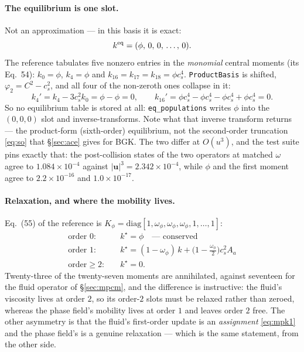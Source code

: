 \documentclass[11pt,a4paper]{article}
\newcommand{\code}[1]{\texttt{\small #1}}
\newcommand{\cs}{c_s}
\newcommand{\uu}{\bm{u}}
\newcommand{\e}[1]{\times 10^{#1}}
\begin{document}
\paragraph{The equilibrium is one slot.} Not an approximation --- in this basis it
is exact:
\begin{equation}
  k^{\rm eq} = (\phi,\,0,\,0,\,\ldots,\,0).
  \label{eq:acekeq}
\end{equation}
The reference tabulates five nonzero entries in the \emph{monomial} central
moments (its Eq.~54): $k_0 = \phi$, $k_4 = \phi$ and
$k_{16}=k_{17}=k_{18}=\phi\cs^4$. \code{ProductBasis} is shifted,
$\varphi_2 = C^2-\cs^2$, and all four of the non-zeroth ones collapse in it:
\[
  k_4' = k_4 - 3\cs^2k_0 = \phi - \phi = 0,
  \qquad
  k_{16}' = \phi\cs^4 - \phi\cs^4 - \phi\cs^4 + \phi\cs^4 = 0 .
\]
So no equilibrium table is stored at all: \code{eq\_populations} writes $\phi$
into the $(0,0,0)$ slot and inverse-transforms. Note what that inverse transform
returns --- the product-form (sixth-order) equilibrium, not the second-order
truncation \eqref{eq:so} that \S\ref{sec:ace} gives for BGK. The two differ at
$O(u^3)$, and the test suite pins exactly that: the post-collision states of the
two operators at matched $\omega$ agree to $1.084\e{-4}$ against
$|\uu|^3 = 2.342\e{-4}$, while $\phi$ and the first moment agree to
$2.2\e{-16}$ and $1.0\e{-17}$.

\paragraph{Relaxation, and where the mobility lives.} Eq.~(55) of the reference is
$K_\phi = \mathrm{diag}[1,\omega_\phi,\omega_\phi,\omega_\phi,1,\ldots,1]$:
\begin{equation}
\begin{aligned}
  \text{order }0:&\quad k^{\star} = \phi \quad\text{--- conserved} \\
  \text{order }1:&\quad k^{\star} = (1-\omega_\phi)\,k
                   + \big(1-\tfrac{\omega_\phi}{2}\big)\cs^2 A_a \\
  \text{order}\geq2:&\quad k^{\star} = 0 .
\end{aligned}
\label{eq:acekstar}
\end{equation}
Twenty-three of the twenty-seven moments are annihilated, against seventeen for
the fluid operator of \S\ref{sec:mpcm}, and the difference is instructive: the
fluid's viscosity lives at order $2$, so its order-$2$ slots must be relaxed
rather than zeroed, whereas the phase field's mobility lives at order $1$ and
leaves order $2$ free. The other asymmetry is that the fluid's first-order update
is an \emph{assignment} \eqref{eq:mpk1} and the phase field's is a genuine
relaxation --- which is the same statement, from the other side.
\end{document}
